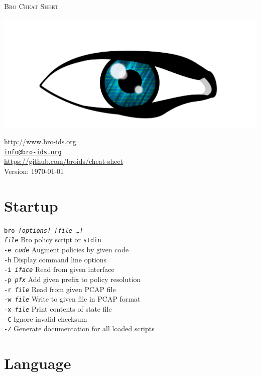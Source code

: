 \documentclass[10pt,landscape]{article}
\begin{document}
\begin{multicols*}{3}
  
{\Huge\scshape Bro Cheat Sheet}

\hfill\includegraphics[width=.4\linewidth]{bro-logo-small}
\vspace{-44pt}

{\scriptsize
\url{http://www.bro-ids.org}\\
\texttt{\href{mailto:info@bro-ids.org}{info@bro-ids.org}}\\
\url{https://github.com/broids/cheat-sheet}\\
Version: \today
}
\vspace{5pt}

\section*{Startup}

\texttt{bro \textit{[options] [file \dots]}}\\
\texttt{\textit{file}} \dotfill Bro policy script or \texttt{stdin}\\
\texttt{-e \textit{code}} \dotfill Augment policies by given code\\
\texttt{-h} \dotfill Display command line options\\
\texttt{-i \textit{iface}} \dotfill Read from given interface\\
\texttt{-p \textit{pfx}} \dotfill Add given prefix to policy resolution\\
\texttt{-r \textit{file}} \dotfill Read from given PCAP file\\
\texttt{-w \textit{file}} \dotfill Write to given file in PCAP format\\
\texttt{-x \textit{file}} \dotfill Print contents of state file\\
\texttt{-C} \dotfill Ignore invalid checksum\\
\texttt{-Z} \dotfill Generate documentation for all loaded scripts\\

\vspace{-10pt}

\section*{Language}


\end{multicols*}
\end{document}
